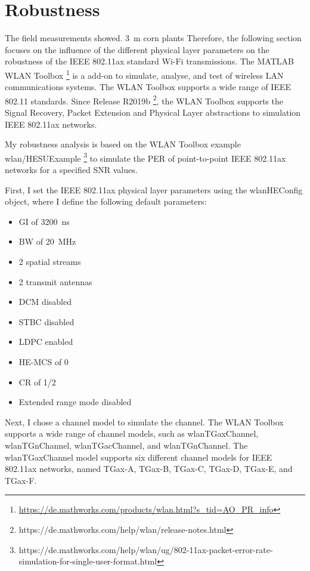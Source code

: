 \section{Robustness}
The field measurements showed.
\cite{smolnik_5g_2020} \SI{3}{\metre} corn plants
Therefore, the following section focuses on the influence of the different physical layer parameters on the robustness of the IEEE 802.11ax standard
Wi-Fi transmissions.
The MATLAB WLAN Toolbox \footnote{\url{https://de.mathworks.com/products/wlan.html?s_tid=AO_PR_info}} is a add-on to simulate, analyse, and test of wireless LAN communications systems.
The WLAN Toolbox supports a wide range of IEEE 802.11 standards.
Since Release R2019b \footnote{https://de.mathworks.com/help/wlan/release-notes.html}, the WLAN Toolbox supports the Signal Recovery, Packet Extension and Physical Layer abstractions to simulation IEEE 802.11ax networks.

My robustness analysis is based on the WLAN Toolbox example wlan/HESUExample \footnote{https://de.mathworks.com/help/wlan/ug/802-11ax-packet-error-rate-simulation-for-single-user-format.html} to simulate the \ac{PER} of point-to-point IEEE 802.11ax networks for
a specified \ac{SNR} values. 

First, I set the IEEE 802.11ax physical layer parameters using the wlanHEConfig object, where I define the following default parameters:
\begin{itemize}
	\item \ac{GI} of \SI{3200}{\nano\second}
	\item \ac{BW} of \SI{20}{\mega\hertz}
	\item 2 spatial streams
	\item 2 transmit antennas
	\item \ac{DCM} disabled
	\item \ac{STBC} disabled
	\item \ac{LDPC} enabled
	\item HE-\ac{MCS} of 0
	\item \ac{CR} of 1/2
	\item Extended range mode disabled
\end{itemize}

Next, I chose a channel model to simulate the channel. The WLAN Toolbox supports a wide range of channel models, such as wlanTGaxChannel, wlanTGnChannel, wlanTGacChannel, and wlanTGnChannel.
The wlanTGaxChannel model supports six different channel models for IEEE 802.11ax networks, named TGax-A, TGax-B, TGax-C, TGax-D, TGax-E, and TGax-F.

